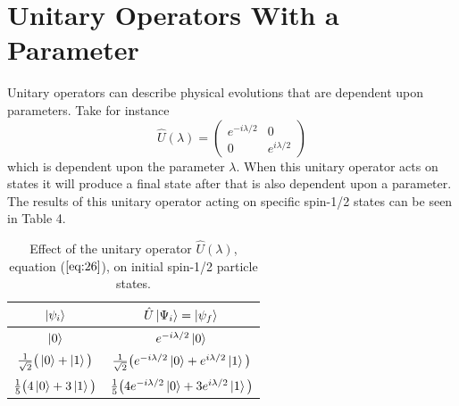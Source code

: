 \documentclass[twocolumn]{article}
\begin{document}
\section*{Unitary Operators With a Parameter}
Unitary operators can describe physical evolutions that are dependent upon parameters. Take for instance 
\begin{equation}\label{eq:26}
\hat{U}(\lambda)=
\begin{pmatrix}
e^{-i\lambda/2} & 0 \\
0 & e^{i\lambda/2}
\end{pmatrix}
\end{equation}
which is dependent upon the parameter $\lambda$. When this unitary operator acts on states it will produce a final state after that is also dependent upon a parameter. The results of this unitary operator acting on specific spin-1/2 states can be seen in Table 4.
\newpage
\begin{table}[h!]
\begin{center}
\begin{tabular}{ |c|c| }
\hline $\ket{\psi_i}$& $\hat{U}\ket{\Psi_i}=\ket{\psi_f}$ \\
\hline $\ket{0}$& $e^{-i\lambda/2}\ket{0}$\\
\hline $\frac{1}{\sqrt{2}}\big(\ket{0}+\ket{1}\big)$& $\frac{1}{\sqrt{2}}\big(e^{-i\lambda/2}\ket{0}+e^{i\lambda/2}\ket{1}\big)$\\
\hline $\frac{1}{5}\big(4\ket{0}+3\ket{1}\big)$& $\frac{1}{5}\big(4e^{-i\lambda/2}\ket{0}+3e^{i\lambda/2}\ket{1}\big)$\\
\hline
\end{tabular}
\caption{Effect of the unitary operator $\hat{U}(\lambda)$, equation ($\ref{eq:26}$), on initial spin-1/2 particle states.}
\end{center}
\end{table} 
\end{document}
